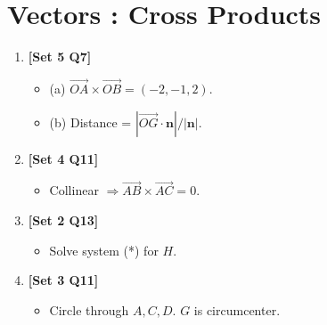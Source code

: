 \documentclass[12pt, a4paper]{article} %
\begin{document}
\section{Vectors : Cross Products}
\begin{enumerate}
    \item \textbf{[Set 5 Q7]}
    \begin{itemize}
        \item (a) $\vec{OA} \times \vec{OB} = (-2, -1, 2)$.
        \item (b) Distance = $|\vec{OG} \cdot \mathbf{n}|/|\mathbf{n}|$.
    \end{itemize}

    \item \textbf{[Set 4 Q11]}
    \begin{itemize}
        \item Collinear $\Rightarrow \vec{AB} \times \vec{AC} = 0$.
    \end{itemize}

    \item \textbf{[Set 2 Q13]}
    \begin{itemize}
        \item Solve system (*) for $H$.
    \end{itemize}

    \item \textbf{[Set 3 Q11]}
    \begin{itemize}
        \item Circle through $A, C, D$. $G$ is circumcenter.
    \end{itemize}
\end{enumerate}
\end{document}
